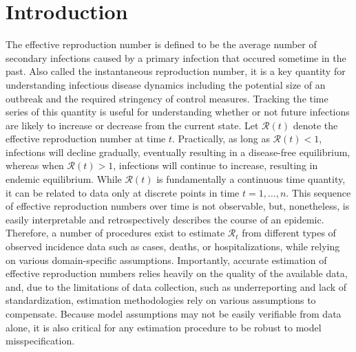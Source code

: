 \documentclass[10pt,letterpaper]{article}
\def\calR{\mathcal{R}}
\begin{document}
\linenumbers

\section{Introduction}
\label{sec:intro}

The effective reproduction number is defined to be the average number of
secondary infections caused by a primary infection that occured sometime in the past.
Also called the instantaneous reproduction number, it is a key quantity
for understanding infectious disease dynamics including the potential size of an
outbreak and the required stringency of control measures.  Tracking the time
series of this quantity is useful for understanding whether or not
future infections are likely to increase or decrease from the current state. Let
$\calR(t)$ denote the effective reproduction number at time $t$. Practically, as
long as $\calR(t) < 1$, infections will decline gradually, eventually resulting
in a disease-free equilibrium, whereas when $\calR(t) > 1$, infections will
continue to increase, resulting in endemic equilibrium. While $\calR(t)$ is
fundamentally a continuous time quantity, it can be related to data only at
discrete points in time $t = 1,\ldots,n$. This sequence of effective
reproduction numbers over time is not observable, but, nonetheless, is easily
interpretable and retrospectively describes the course of an epidemic.
Therefore, a number of procedures exist to estimate $\calR_t$ from different
types of observed incidence data such as cases, deaths, or hospitalizations,
while relying on various domain-specific assumptions. Importantly, accurate
estimation of effective reproduction numbers relies heavily on the quality of
the available data, and, due to the limitations of data collection, such as
underreporting and lack of standardization, estimation methodologies rely on
various assumptions to compensate. Because model assumptions may not be easily
verifiable from data alone, it is also critical for any estimation procedure to
be robust to model misspecification. 
\end{document}
